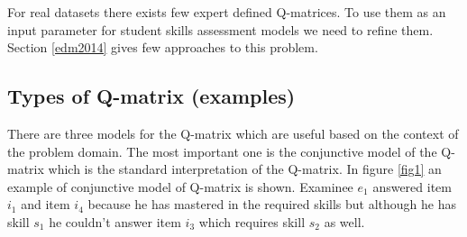 For real datasets there exists few expert defined Q-matrices. To use them as an input parameter for student skills assessment models we need to refine them. Section \ref{edm2014} gives few approaches to this problem.


\subsection{Types of Q-matrix (examples) }

There are three models for the Q-matrix which are useful based on the context of the problem domain. The most important one is the conjunctive model of the Q-matrix which is the standard interpretation of the Q-matrix. In figure \ref{fig1} an example of conjunctive model of Q-matrix is shown. Examinee $e_{1}$ answered item $i_{1}$ and item $i_{4}$ because he has mastered in the required skills but although he has skill $s_{1}$ he couldn't answer item $i_{3}$ which requires skill $s_{2}$ as well.


